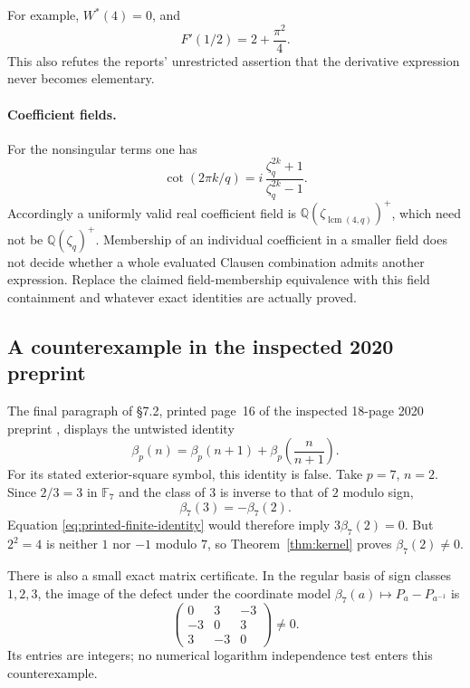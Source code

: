 \documentclass[11pt]{article}
\numberwithin{equation}{section}
\theoremstyle{definition}
\theoremstyle{remark}
\newcommand{\Q}{\mathbb Q}
\begin{document}
For example, $W^*(4)=0$, and
\begin{equation}\label{eq:Fprimehalf}
 F'(1/2)=2+\frac{\pi^2}4.
\end{equation}
This also refutes the reports' unrestricted assertion that the
derivative expression never becomes elementary.

\paragraph{Coefficient fields.}
For the nonsingular terms one has
\[
 \cot(2\pi k/q)=i\,\frac{\zeta_q^{2k}+1}{\zeta_q^{2k}-1}.
\]
Accordingly a uniformly valid real coefficient field is
$\Q(\zeta_{\operatorname{lcm}(4,q)})^+$, which need not be
$\Q(\zeta_q)^+$. Membership of an individual coefficient in a
smaller field does not decide whether a whole evaluated Clausen
combination admits another expression. Replace the claimed
field-membership equivalence with this field containment
and whatever exact identities are actually proved.

\subsection{A counterexample in the inspected 2020 preprint}
\label{sec:preprint-counterexample}

The final paragraph of \S7.2, printed page~16 of the inspected
18-page 2020 preprint \cite{RZ}, displays the untwisted identity
\begin{equation}\label{eq:printed-finite-identity}
 \beta_p(n)=\beta_p(n+1)+\beta_p\!\left(\frac n{n+1}\right).
\end{equation}
For its stated exterior-square symbol, this identity is false.
Take $p=7$, $n=2$. Since $2/3=3$ in $\mathbb F_7$ and the class
of $3$ is inverse to that of $2$ modulo sign,
\[
 \beta_7(3)=-\beta_7(2).
\]
Equation \eqref{eq:printed-finite-identity} would therefore imply
$3\beta_7(2)=0$. But $2^2=4$ is neither $1$ nor $-1$ modulo $7$,
so Theorem~\ref{thm:kernel} proves $\beta_7(2)\ne0$.

There is also a small exact matrix certificate. In the regular basis
of sign classes $1,2,3$, the image of the defect under the coordinate
model $\beta_7(a)\mapsto P_a-P_{a^{-1}}$ is
\begin{equation}\label{eq:p7-defect}
 \begin{pmatrix}
 0&3&-3\\-3&0&3\\3&-3&0
 \end{pmatrix}\ne0.
\end{equation}
Its entries are integers; no numerical logarithm independence test
enters this counterexample.
\end{document}
